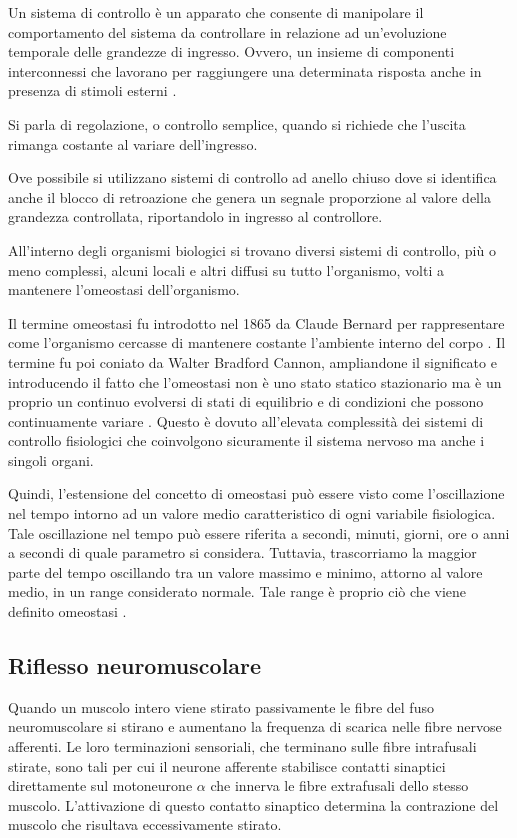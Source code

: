 Un sistema di controllo è un apparato che consente di manipolare il comportamento del sistema da controllare in relazione ad un'evoluzione temporale delle grandezze di ingresso. Ovvero, un insieme di componenti interconnessi che lavorano per raggiungere una determinata risposta anche in presenza di stimoli esterni \cite{marro_controlli_2004}.  

Si parla di regolazione, o controllo semplice, quando si richiede che l'uscita rimanga costante al variare dell'ingresso.

Ove possibile si utilizzano sistemi di controllo ad anello chiuso dove si identifica anche il blocco di retroazione che genera un segnale proporzione al valore della grandezza controllata, riportandolo in ingresso al controllore.

All'interno degli organismi biologici si trovano diversi sistemi di controllo, più o meno complessi, alcuni locali e altri diffusi su tutto l'organismo, volti a mantenere l'omeostasi dell'organismo. 

Il termine omeostasi fu introdotto nel 1865 da Claude Bernard per rappresentare come l'organismo cercasse di mantenere costante l'ambiente interno del corpo \cite{bernard1957introduction}. Il termine fu poi coniato da Walter Bradford Cannon, ampliandone il significato e introducendo il fatto che l'omeostasi non è uno stato statico stazionario ma è un proprio un continuo evolversi di stati di equilibrio e di condizioni che possono continuamente variare \cite{cannon1939wisdom}. Questo è dovuto all'elevata complessità dei sistemi di controllo fisiologici che coinvolgono sicuramente il sistema nervoso ma anche i singoli organi. 

Quindi, l'estensione del concetto di omeostasi può essere visto come l'oscillazione nel tempo intorno ad un valore medio caratteristico di ogni variabile fisiologica. Tale oscillazione nel tempo può essere riferita a secondi, minuti, giorni, ore o anni a secondi di quale parametro si considera. Tuttavia, trascorriamo la maggior parte del tempo oscillando tra un valore massimo e minimo, attorno al valore medio, in un range considerato normale. Tale range è proprio ciò che viene definito omeostasi \cite{davies_adaptive_2016}. 

\subsection{Riflesso neuromuscolare}



Quando un muscolo intero viene stirato passivamente le fibre del fuso neuromuscolare si stirano e aumentano la frequenza di scarica nelle fibre nervose afferenti. Le loro terminazioni sensoriali, che terminano sulle fibre intrafusali stirate, sono tali per cui il neurone afferente stabilisce contatti sinaptici direttamente sul motoneurone $\alpha$ che innerva le fibre extrafusali dello stesso muscolo. L'attivazione di questo contatto sinaptico determina la contrazione del muscolo che risultava eccessivamente stirato.

